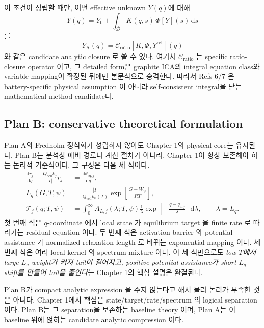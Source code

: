 \documentclass[11pt,a4paper]{article}
\newcommand{\dd}{\mathrm{d}}
\newcommand{\eq}{\mathrm{eq}}
\newcommand{\cell}{\mathrm{cell}}
\begin{document}
이 조건이 성립할 때만, 어떤 effective unknown $Y(q)$에 대해
\begin{equation}
Y(q)=Y_0+\int_{\mathcal D}K(q,s)\,\Phi[Y](s)\,\dd s
\label{eq:closure_general}
\end{equation}
를
\begin{equation}
Y_{\mathrm A}(q)=
\mathcal C_{\mathrm{ratio}}\!\left[K,\Phi,Y^{\mathrm{ref}}\right](q)
\label{eq:plan_a_closure}
\end{equation}
와 같은 candidate analytic closure 로 쓸 수 있다. 여기서 $\mathcal C_{\mathrm{ratio}}$ 는
specific ratio-closure operator 이고, 그 detailed form은 graphite ICA의 integral equation class와
variable mapping이 확정된 뒤에만 본문식으로 승격한다. 따라서 Refs 6/7 은 battery-specific
physical assumption 이 아니라 self-consistent integral을 닫는 mathematical method candidate다.

\subsection{Plan B: conservative theoretical formulation}\label{sec:track2}
Plan A의 Fredholm 정식화가 성립하지 않아도 Chapter 1의 physical core는 유지된다. Plan B는
분석상 예비 경로나 계산 절차가 아니라, Chapter 1이 항상 보존해야 하는 논리적 기준식이다.
그 구성은 다음 세 식이다.
\begin{align}
\frac{\dd r_j}{\dd q}+\frac{Q_\cell k_j}{|I|}r_j
&=
\frac{\dd\theta_{\eq,j}}{\dd q},
\label{eq:planb_residual}
\\
L_q(G,T,\psi)
&=
\frac{|I|}{Q_\cell k_0(T)}
\exp\!\left[\frac{G-W_\psi}{RT}\right],
\label{eq:planb_length}
\\
\mathcal T_j(q;T,\psi)
&=
\int_0^\infty
A_{L,j}(\lambda;T,\psi)\frac{1}{\lambda}
\exp\!\left[-\frac{q-q_{a,j}}{\lambda}\right]\dd \lambda,
\qquad \lambda=L_q.
\label{eq:planb_tail}
\end{align}
첫 번째 식은 $q$-coordinate 에서 local state 가 equilibrium target 을 finite rate 로 따라가는 residual equation 이다.
두 번째 식은 activation barrier 와 potential assistance 가 normalized relaxation length 로 바뀌는 exponential
mapping 이다. 세 번째 식은 여러 local kernel 의 spectrum mixture 이다. 이 세 식만으로도
\emph{low $T$에서 large-$L_q$ weight가 커져 tail이 길어지고, positive potential assistance가
short-$L_q$ shift를 만들어 tail을 줄인다}는 Chapter 1의 핵심 설명은 완결된다.

Plan B가 compact analytic expression 을 주지 않는다고 해서 물리 논리가 부족한 것은 아니다. Chapter 1에서
핵심은 state/target/rate/spectrum 의 logical separation 이다. Plan B는 그
separation을 보존하는 baseline theory 이며, Plan A는 이 baseline 위에 얹히는 candidate analytic
compression 이다.
\end{document}
